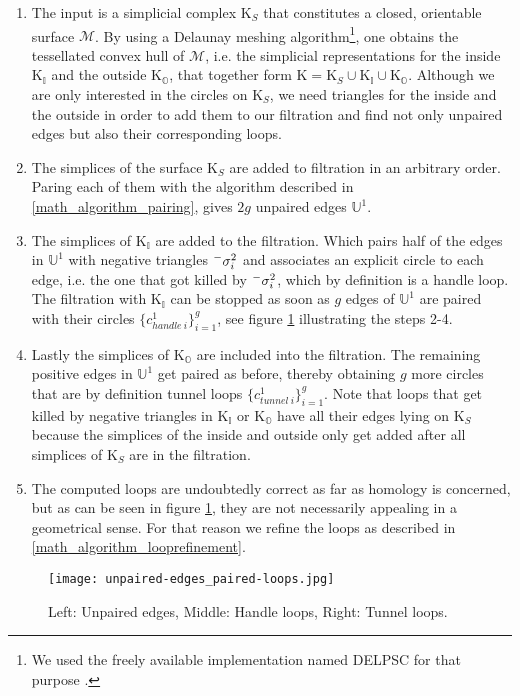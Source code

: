 \begin{enumerate}
\setlength{\itemsep}{0cm}
\setlength{\parskip}{0.15cm}
\item The input is a simplicial complex $\mathrm{K}_{S}$ that constitutes a closed, orientable surface $\mathcal{M}$. By using a Delaunay meshing algorithm\footnote{ We used the freely available implementation named \textsc{DELPSC} for that purpose \citep[cf.][]{Cheng2007}.}, one obtains the tessellated convex hull of $\mathcal{M}$, i.e. the simplicial representations for the inside $\mathrm{K}_{\mathbb{I}}$ and the outside $\mathrm{K}_{\mathbb{O}}$, that together form $\mathrm{K} = \mathrm{K}_{S} \cup \mathrm{K}_{\mathbb{I}} \cup \mathrm{K}_{\mathbb{O}}$. Although we are only interested in the circles on $\mathrm{K}_{S}$, we need triangles for the inside and the outside in order to add them to our filtration and find not only unpaired edges but also their corresponding loops.
\item The simplices of the surface $\mathrm{K}_{S}$ are added to filtration in an arbitrary order. Paring each of them with the algorithm described in \ref{math_algorithm_pairing}, gives $2g$ unpaired edges $\mathbb{U}^{1}$.
\item The simplices of $\mathrm{K}_{\mathbb{I}}$ are added to the filtration. Which pairs half of the edges in $\mathbb{U}^{1}$ with negative triangles $\Prefix^{-}{\sigma_{i}^{2}}$ and associates an explicit circle to each edge, i.e. the one that got killed by $\Prefix^{-}{\sigma_{i}^{2}}$, which by definition is a handle loop. The filtration with $\mathrm{K}_{\mathbb{I}}$ can be stopped as soon as $g$ edges of $\mathbb{U}^{1}$ are paired with their circles $\{c^{1}_{handle~i}\}^{g}_{i=1}$, see figure \ref{fig:unpaired-edges_paired-loops} illustrating the steps 2-4.
\item Lastly the simplices of $\mathrm{K}_{\mathbb{O}}$ are included into the filtration. The remaining positive edges in $\mathbb{U}^{1}$ get paired as before, thereby obtaining $g$ more circles that are by definition tunnel loops $\{c^{1}_{tunnel~i}\}^{g}_{i=1}$. Note that loops that get killed by negative triangles in $\mathrm{K}_{\mathbb{I}}$ or $\mathrm{K}_{\mathbb{O}}$ have all their edges lying on $\mathrm{K}_{S}$ because the simplices of the inside and outside only get added after all simplices of $\mathrm{K}_{S}$ are in the filtration.
\item The computed loops are undoubtedly correct as far as homology is concerned, but as can be seen in figure \ref{fig:unpaired-edges_paired-loops}, they are not necessarily appealing in a geometrical sense. For that reason we refine the loops as described in \ref{math_algorithm_looprefinement}.
\end{enumerate}
\begin{figure}[htb]
\centering
\texttt{[image: unpaired-edges\_paired-loops.jpg]}
\caption{Left: Unpaired edges, Middle: Handle loops, Right: Tunnel loops.}
\label{fig:unpaired-edges_paired-loops}
\bigskip
\end{figure}

